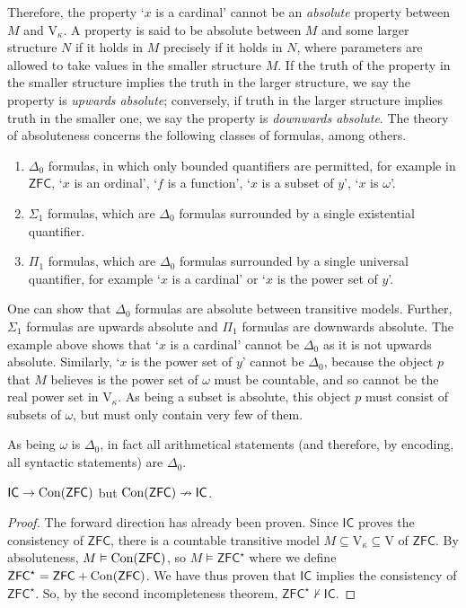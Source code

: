 Therefore, the property `\( x \) is a cardinal' cannot be an \emph{absolute} property between \( M \) and \( \mathrm{V}_\kappa \).
A property is said to be absolute between \( M \) and some larger structure \( N \) if it holds in \( M \) precisely if it holds in \( N \), where parameters are allowed to take values in the smaller structure \( M \).
If the truth of the property in the smaller structure implies the truth in the larger structure, we say the property is \emph{upwards absolute}; conversely, if truth in the larger structure implies truth in the smaller one, we say the property is \emph{downwards absolute}.
The theory of absoluteness concerns the following classes of formulas, among others.
\begin{enumerate}
    \item \( \Delta_0 \) formulas, in which only bounded quantifiers are permitted, for example in \( \mathsf{ZFC} \), `\( x \) is an ordinal', `\( f \) is a function', `\( x \) is a subset of \( y \)', `\( x \) is \( \omega \)'.
    \item \( \Sigma_1 \) formulas, which are \( \Delta_0 \) formulas surrounded by a single existential quantifier.
    \item \( \Pi_1 \) formulas, which are \( \Delta_0 \) formulas surrounded by a single universal quantifier, for example `\( x \) is a cardinal' or `\( x \) is the power set of \( y \)'.
\end{enumerate}
One can show that \( \Delta_0 \) formulas are absolute between transitive models.
Further, \( \Sigma_1 \) formulas are upwards absolute and \( \Pi_1 \) formulas are downwards absolute.
The example above shows that `\( x \) is a cardinal' cannot be \( \Delta_0 \) as it is not upwards absolute.
Similarly, `\( x \) is the power set of \( y \)' cannot be \( \Delta_0 \), because the object \( p \) that \( M \) believes is the power set of \( \omega \) must be countable, and so cannot be the real power set in \( \mathrm{V}_\kappa \).
As being a subset is absolute, this object \( p \) must consist of subsets of \( \omega \), but must only contain very few of them.

As being \( \omega \) is \( \Delta_0 \), in fact all arithmetical statements (and therefore, by encoding, all syntactic statements) are \( \Delta_0 \).
\begin{theorem}
    \( \mathsf{IC} \to \operatorname{Con}(\mathsf{ZFC}) \) but \( \operatorname{Con}(\mathsf{ZFC}) \nrightarrow \mathsf{IC} \).
\end{theorem}
\begin{proof}
    The forward direction has already been proven.
    Since \( \mathsf{IC} \) proves the consistency of \( \mathsf{ZFC} \), there is a countable transitive model \( M \subseteq \mathrm{V}_\kappa \subseteq \mathrm{V} \) of \( \mathsf{ZFC} \).
    By absoluteness, \( M \vDash \operatorname{Con}(\mathsf{ZFC}) \), so \( M \vDash \mathsf{ZFC}^\star \) where we define \( \mathsf{ZFC}^\star = \mathsf{ZFC} + \operatorname{Con}(\mathsf{ZFC}) \).
    We have thus proven that \( \mathsf{IC} \) implies the consistency of \( \mathsf{ZFC}^\star \).
    So, by the second incompleteness theorem, \( \mathsf{ZFC}^\star \nvdash \mathsf{IC} \).
\end{proof}

